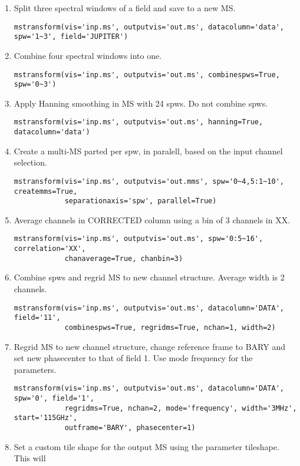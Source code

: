 \begin{enumerate}
\item Split three spectral windows of a field and save to a new MS.
\begin{verbatim}
mstransform(vis='inp.ms', outputvis='out.ms', datacolumn='data', spw='1~3', field='JUPITER')
\end{verbatim}
\item Combine four spectral windows into one.
\begin{verbatim}
mstransform(vis='inp.ms', outputvis='out.ms', combinespws=True, spw='0~3')
\end{verbatim}
\item Apply Hanning smoothing in MS with 24 spws. Do not combine spws.
\begin{verbatim}
mstransform(vis='inp.ms', outputvis='out.ms', hanning=True, datacolumn='data')
\end{verbatim}
\item Create a multi-MS parted per spw, in paralell, based on the input channel selection.
\begin{verbatim}
mstransform(vis='inp.ms', outputvis='out.mms', spw='0~4,5:1~10', createmms=True,
            separationaxis='spw', parallel=True)
\end{verbatim}
\item Average channels in CORRECTED column using a bin of 3 channels in XX.
\begin{verbatim}
mstransform(vis='inp.ms', outputvis='out.ms', spw='0:5~16', correlation='XX', 
            chanaverage=True, chanbin=3)
\end{verbatim}
\item Combine spws and regrid MS to new channel structure. Average width is 2 channels.
\begin{verbatim}
mstransform(vis='inp.ms', outputvis='out.ms', datacolumn='DATA', field='11',
            combinespws=True, regridms=True, nchan=1, width=2)
\end{verbatim}
\item Regrid MS to new channel structure, change reference frame to BARY and set
new phasecenter to that of field 1. Use mode frequency for the parameters.
\begin{verbatim}
mstransform(vis='inp.ms', outputvis='out.ms', datacolumn='DATA', spw='0', field='1', 
            regridms=True, nchan=2, mode='frequency', width='3MHz', start='115GHz', 
            outframe='BARY', phasecenter=1)
\end{verbatim}
\item Set a custom tile shape for the output MS using the parameter tileshape. This will

\end{enumerate}
